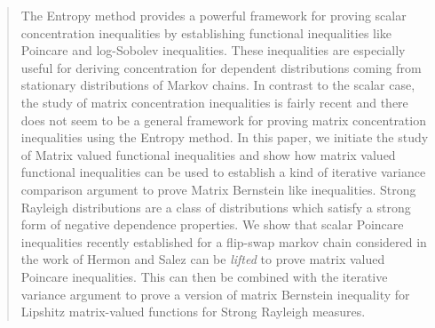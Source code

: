 \begin{abstract}
The Entropy method provides a powerful framework for proving scalar concentration inequalities by establishing functional inequalities like Poincare and log-Sobolev inequalities. These inequalities are especially useful for deriving concentration for dependent distributions coming from stationary distributions of Markov chains. In contrast to the scalar case, the study of matrix concentration inequalities is fairly recent and there does not seem to be a general framework for proving matrix concentration inequalities using the Entropy method. In this paper, we initiate the study of Matrix valued functional inequalities and show how matrix valued functional inequalities can be used to establish a kind of iterative variance comparison argument to prove Matrix Bernstein like inequalities. Strong Rayleigh distributions are a class of distributions which satisfy a strong form of negative dependence properties. We show that scalar Poincare inequalities recently established for a flip-swap markov chain considered in the work of Hermon and Salez \cite{HS19} can be \textit{lifted} to prove matrix valued Poincare inequalities. This can then be combined with the iterative variance argument to prove a version of matrix Bernstein inequality for Lipshitz matrix-valued functions for Strong Rayleigh measures. 
\end{abstract}
